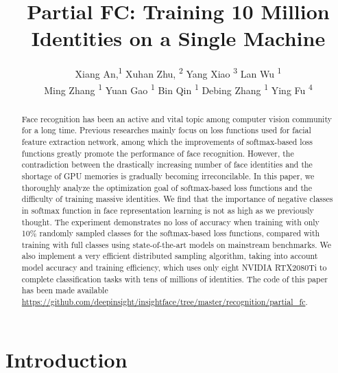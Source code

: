 \documentclass[letterpaper]{article} \usepackage{style/aaai21}  \usepackage{times}  \usepackage{helvet} \usepackage{courier}  \usepackage[hyphens]{url}  \usepackage{graphicx} \usepackage{color}
\title{ 
Partial FC: Training 10 Million Identities on a Single Machine
}
\author {
Xiang An,\textsuperscript{\rm 1}
         Xuhan Zhu, \textsuperscript{\rm 2}
         Yang Xiao \textsuperscript{\rm 3} 
         Lan Wu \textsuperscript{\rm 1} \\
         Ming Zhang \textsuperscript{\rm 1}
         Yuan Gao \textsuperscript{\rm 1} 
         Bin Qin \textsuperscript{\rm 1} 
         Debing Zhang \textsuperscript{\rm 1} 
         Ying Fu  \textsuperscript{\rm 4} \\
 }
\begin{document}
\maketitle


\begin{abstract}
Face recognition has been an active and vital topic among computer vision community for a long time. Previous researches mainly focus on loss functions used for facial feature extraction network, among which the improvements of softmax-based loss functions greatly promote the performance of face recognition. However, the contradiction between the drastically increasing number of face identities and the shortage of GPU memories is gradually becoming irreconcilable. 
In this paper, we thoroughly analyze the optimization goal of softmax-based loss functions and the difficulty of training massive identities. We find that the importance of negative classes in softmax function in face representation learning is not as high as we previously thought. The experiment demonstrates no loss of accuracy when training with only 10\% randomly sampled classes for the softmax-based loss functions, compared with training with full classes using state-of-the-art models on mainstream benchmarks. We also implement a very efficient distributed sampling algorithm, taking into account model accuracy and training efficiency, which uses only eight NVIDIA RTX2080Ti to complete classification tasks with tens of millions of identities. The code of this paper has been made available \url{https://github.com/deepinsight/insightface/tree/master/recognition/partial_fc}. 
\end{abstract}

\section{Introduction}
\end{document}
